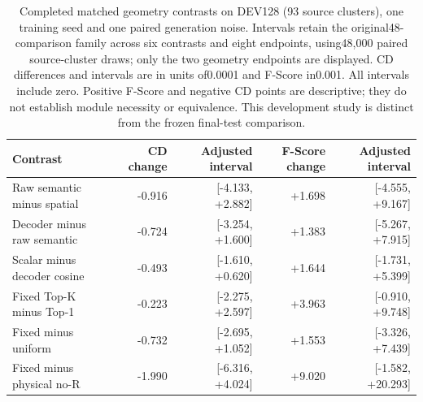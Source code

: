 \begin{table}[t]
\centering\small
\setlength{\tabcolsep}{4pt}
\begin{tabular}{lrrrr}
\toprule
Contrast&CD change&Adjusted interval&F-Score change&Adjusted interval\\
\midrule
Raw semantic minus spatial&-0.916&[-4.133, +2.882]&+1.698&[-4.555, +9.167]\\
Decoder minus raw semantic&-0.724&[-3.254, +1.600]&+1.383&[-5.267, +7.915]\\
Scalar minus decoder cosine&-0.493&[-1.610, +0.620]&+1.644&[-1.731, +5.399]\\
Fixed Top-K minus Top-1&-0.223&[-2.275, +2.597]&+3.963&[-0.910, +9.748]\\
Fixed minus uniform&-0.732&[-2.695, +1.052]&+1.553&[-3.326, +7.439]\\
Fixed minus physical no-R&-1.990&[-6.316, +4.024]&+9.020&[-1.582, +20.293]\\
\bottomrule
\end{tabular}
\caption{Completed matched geometry contrasts on DEV128 (93 source clusters), one training seed and one paired generation noise. Intervals retain the original48-comparison family across six contrasts and eight endpoints, using48,000 paired source-cluster draws; only the two geometry endpoints are displayed. CD differences and intervals are in units of0.0001 and F-Score in0.001. All intervals include zero. Positive F-Score and negative CD points are descriptive; they do not establish module necessity or equivalence. This development study is distinct from the frozen final-test comparison.}
\label{tab:dev-geometry-contrasts128}
\end{table}
